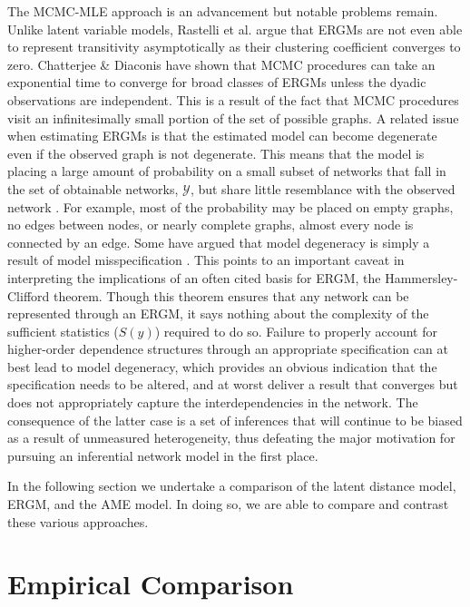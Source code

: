 \documentclass[12pt,twocolumn,twoside]{pnas-new}
\begin{document}
The MCMC-MLE approach is an advancement but notable problems remain. Unlike latent variable models, Rastelli et al. \citep{rastelli:etal:2016} argue that ERGMs are not even able to represent transitivity asymptotically as their clustering coefficient converges to zero. Chatterjee \& Diaconis \citep{chatterjee:diaconis:2013} have shown that MCMC procedures can take an exponential time to converge for broad classes of ERGMs unless the dyadic observations are independent. This is a result of the fact that MCMC procedures visit an infinitesimally small portion of the set of possible graphs. A related issue when estimating ERGMs is that the estimated model can become degenerate even if the observed graph is not degenerate. This means that the model is placing a large amount of probability on a small subset of networks that fall in the set of obtainable networks, $\mathcal{Y}$, but share little resemblance with the observed network \citep{schweinberger:2011}. For example, most of the probability may be placed on empty graphs, no edges between nodes, or nearly complete graphs, almost every node is connected by an edge. Some have argued that model degeneracy is simply a result of model misspecification \citep{goodreau:etal:2008,handcock:etal:2008}. This points to an important caveat in interpreting the implications of an often cited basis for ERGM, the Hammersley-Clifford theorem. Though this theorem ensures that any network can be represented through an ERGM, it says nothing about the complexity of the sufficient statistics ($S(y)$) required to do so. Failure to properly account for higher-order dependence structures through an appropriate specification can at best lead to model degeneracy, which provides an obvious indication that the specification needs to be altered, and at worst deliver a result that converges but does not appropriately capture the interdependencies in the network. The consequence of the latter case is a set of inferences that will continue to be biased as a result of unmeasured heterogeneity, thus defeating the major motivation for pursuing an inferential network model in the first place. 

In the following section we undertake a comparison of the latent distance model, ERGM, and the AME model. In doing so, we are able to compare and contrast these various approaches.

\section*{\textbf{Empirical Comparison}}
\end{document}
